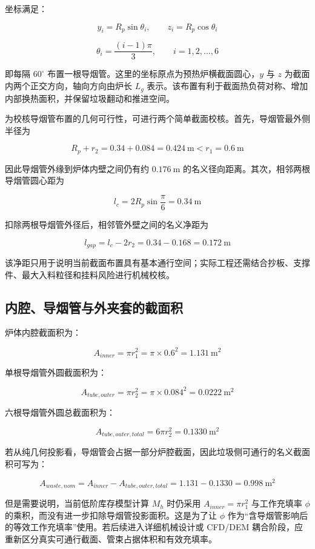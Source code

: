 \documentclass[UTF8,openany,zihao=-4,oneside]{ctexbook}
\begin{document}
坐标满足：

\[
y_i=R_p\sin\theta_i,\qquad z_i=R_p\cos\theta_i
\]

\[
\theta_i=\frac{(i-1)\pi}{3},\qquad i=1,2,\ldots,6
\]

即每隔 \(60^\circ\) 布置一根导烟管。这里的坐标原点为预热炉横截面圆心，\(y\) 与 \(z\) 为截面内两个正交方向，轴向方向由炉长 \(L_g\) 表示。该布置有利于截面热负荷对称、增加内部换热面积，并保留垃圾翻动和推进空间。

为校核导烟管布置的几何可行性，可进行两个简单截面校核。首先，导烟管最外侧半径为

\[
R_p+r_2=0.34+0.084=0.424\ \mathrm{m}<r_1=0.6\ \mathrm{m}
\]

因此导烟管外缘到炉体内壁之间仍有约 \(0.176\ \mathrm{m}\) 的名义径向距离。其次，相邻两根导烟管圆心距为

\[
l_c=2R_p\sin\frac{\pi}{6}=0.34\ \mathrm{m}
\]

扣除两根导烟管外径后，相邻管外壁之间的名义净距为

\[
l_{gap}=l_c-2r_2=0.34-0.168=0.172\ \mathrm{m}
\]

该净距只用于说明当前截面布置具有基本通行空间；实际工程还需结合抄板、支撑件、最大入料粒径和挂料风险进行机械校核。

\subsection{内腔、导烟管与外夹套的截面积}\label{ux5185ux8154ux5bfcux70dfux7ba1ux4e0eux5916ux5939ux5957ux7684ux622aux9762ux79ef}

炉体内腔截面积为：

\[
A_{inner}=\pi r_1^2=\pi\times0.6^2=1.131\ \mathrm{m^2}
\]

单根导烟管外圆截面积为：

\[
A_{tube,outer}=\pi r_2^2=\pi\times0.084^2=0.0222\ \mathrm{m^2}
\]

六根导烟管外圆总截面积为：

\[
A_{tube,outer,total}=6\pi r_2^2=0.1330\ \mathrm{m^2}
\]

若从纯几何投影看，导烟管会占据一部分炉腔截面，因此垃圾侧可通行的名义截面积可写为：

\[
A_{waste,nom}=A_{inner}-A_{tube,outer,total}=1.131-0.1330=0.998\ \mathrm{m^2}
\]

但是需要说明，当前低阶库存模型计算 \(M_h\) 时仍采用 \(A_{inner}=\pi r_1^2\) 与工作充填率 \(\phi\) 的乘积，而没有进一步扣除导烟管投影面积。这是为了让 \(\phi\) 作为“含导烟管影响后的等效工作充填率”使用。若后续进入详细机械设计或 CFD/DEM 耦合阶段，应重新区分真实可通行截面、管束占据体积和有效充填率。
\end{document}
